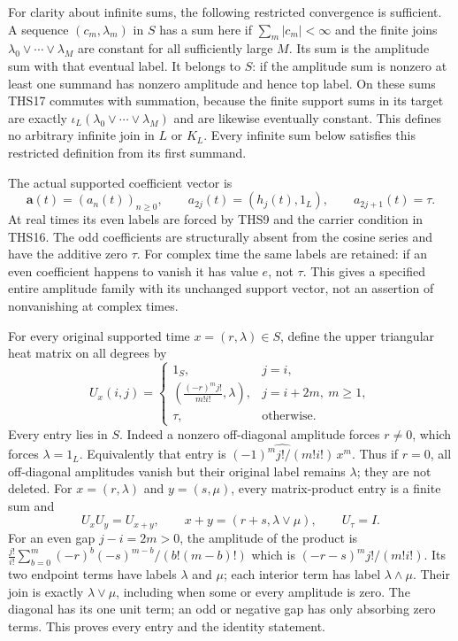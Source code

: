 For clarity about infinite sums, the following restricted
convergence is sufficient. A sequence $(c_m,\lambda_m)$ in $S$
has a sum here if $\sum_m|c_m|<\infty$ and the finite joins
$\lambda_0\vee\cdots\vee\lambda_M$ are constant for all
sufficiently large $M$. Its sum is the amplitude sum with that
eventual label. It belongs to $S$: if the amplitude sum is
nonzero at least one summand has nonzero amplitude and hence
top label. On these sums THS17 commutes with summation, because
the finite support sums in its target are exactly
$\iota_L(\lambda_0\vee\cdots\vee\lambda_M)$ and are likewise
eventually constant. This defines no arbitrary infinite join
in $L$ or $K_L$. Every infinite sum below satisfies this
restricted definition from its first summand.

The actual supported coefficient vector is
\begin{equation}\tag{THS18}
 \mathbf a(t)=(a_n(t))_{n\ge0},\qquad
 a_{2j}(t)=(h_j(t),1_L),\qquad a_{2j+1}(t)=\tau.
\end{equation}
At real times its even labels are forced by THS9 and the carrier
condition in THS16. The odd coefficients are structurally absent
from the cosine series and have the additive zero $\tau$.
For complex time the same labels are retained: if an even
coefficient happens to vanish it has value $e$, not $\tau$.
This gives a specified entire amplitude family with its unchanged
support vector, not an assertion of nonvanishing at complex times.

For every original supported time $x=(r,\lambda)\in S$, define
the upper triangular heat matrix on all degrees by
\begin{equation}\tag{THS19}
 U_x(i,j)=
 \begin{cases}
 1_S,&j=i,\\
 \displaystyle\left(\frac{(-r)^m j!}{m!i!},\lambda\right),
       &j=i+2m,\ m\ge1,\\
 \tau,&\text{otherwise}.
 \end{cases}
\end{equation}
Every entry lies in $S$. Indeed a nonzero off-diagonal amplitude
forces $r\ne0$, which forces $\lambda=1_L$. Equivalently that
entry is $\widehat{(-1)^m j!/(m!i!)}\,x^m$.
Thus if $r=0$, all off-diagonal amplitudes vanish but their
original label remains $\lambda$; they are not deleted.
For $x=(r,\lambda)$ and $y=(s,\mu)$, every matrix-product entry
is a finite sum and
\begin{equation}\tag{THS20}
 U_xU_y=U_{x+y},\qquad
 x+y=(r+s,\lambda\vee\mu),\qquad U_\tau=I.
\end{equation}
For an even gap $j-i=2m>0$, the amplitude of the product is
$\frac{j!}{i!}\sum_{b=0}^m(-r)^b(-s)^{m-b}/(b!(m-b)!)$
which is $(-r-s)^mj!/(m!i!)$. Its two endpoint terms have
labels $\lambda$ and $\mu$; each interior term has label
$\lambda\wedge\mu$. Their join is exactly $\lambda\vee\mu$,
including when some or every amplitude is zero. The diagonal
has its one unit term; an odd or negative gap has only absorbing
zero terms. This proves every entry and the identity statement.

